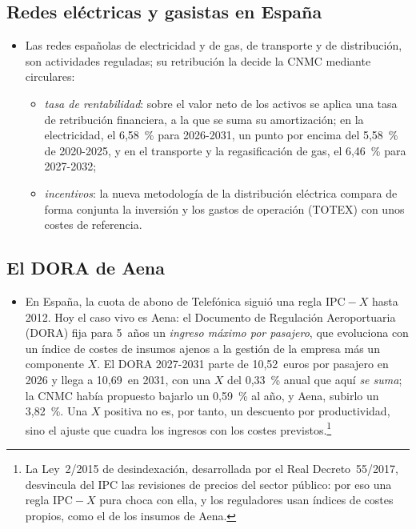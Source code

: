 \documentclass[11pt]{article}
\begin{document}
\subsection{Redes eléctricas y gasistas en España}\label{anexo:redes-espana}

\begin{itemize}
\item Las redes españolas de electricidad y de gas, de transporte y de distribución, son actividades reguladas; su retribución la decide la CNMC mediante circulares:
  \begin{itemize}
  \item \emph{tasa de rentabilidad}: sobre el valor neto de los activos se aplica una tasa de retribución financiera, a la que se suma su amortización\nocite{CNMC2019Circular2}; en la electricidad, el 6,58~\% para 2026-2031, un punto por encima del 5,58~\% de 2020-2025\nocite{CNMC2025Circular9,CNMC2025NPCirculares}, y en el transporte y la regasificación de gas, el 6,46~\% para 2027-2032\nocite{CNMC2026Circular5};
  \item \emph{incentivos}: la nueva metodología de la distribución eléctrica compara de forma conjunta la inversión y los gastos de operación (TOTEX) con unos costes de referencia\nocite{CNMC2025Circular8}.
  \end{itemize}
\end{itemize}

\subsection{El DORA de Aena}\label{anexo:dora}

\begin{itemize}
\item En España, la cuota de abono de Telefónica siguió una regla $\mathrm{IPC}-X$ hasta 2012\nocite{CNMC2018CuotaAbono}. Hoy el caso vivo es Aena: el Documento de Regulación Aeroportuaria (DORA) fija para 5~años un \emph{ingreso máximo por pasajero}, que evoluciona con un índice de costes de insumos ajenos a la gestión de la empresa más un componente $X$. El DORA 2027-2031 parte de 10,52~euros por pasajero en 2026 y llega a 10,69~en 2031, con una $X$ del 0,33~\% anual que aquí \emph{se suma}\nocite{BOE2026DORA}; la CNMC había propuesto bajarlo un 0,59~\% al año, y Aena, subirlo un 3,82~\%\nocite{CNMC2026InformeDORA}. Una $X$ positiva no es, por tanto, un descuento por productividad, sino el ajuste que cuadra los ingresos con los costes previstos.\footnote{La Ley~2/2015 de desindexación, desarrollada por el Real Decreto~55/2017, desvincula del IPC las revisiones de precios del sector público\nocite{BOE2015Desindexacion,BOE2017RD55}: por eso una regla $\mathrm{IPC}-X$ pura choca con ella, y los reguladores usan índices de costes propios, como el de los insumos de Aena.}
\end{itemize}
\end{document}
